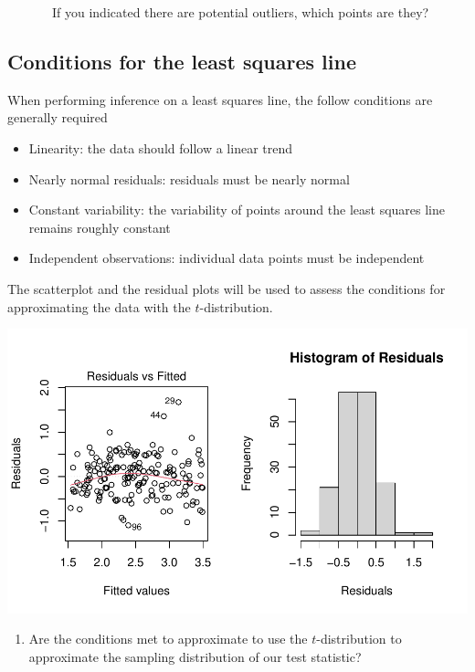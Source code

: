 \documentclass[
]{report}
\providecommand{\tightlist}{%
  \setlength{\itemsep}{0pt}\setlength{\parskip}{0pt}}
\begin{document}
\vspace{1in}

~~~~~~~If you indicated there are potential outliers, which points are they?

\vspace{0.5in}

\hypertarget{conditions-for-the-least-squares-line}{%
\subsection*{Conditions for the least squares line}\label{conditions-for-the-least-squares-line}}

When performing inference on a least squares line, the follow conditions are generally required

\begin{itemize}
\item
  Linearity: the data should follow a linear trend
\item
  Nearly normal residuals: residuals must be nearly normal
\item
  Constant variability: the variability of points around the least squares line remains roughly constant
\item
  Independent observations: individual data points must be independent
\end{itemize}

The scatterplot and the residual plots will be used to assess the conditions for approximating the data with the \(t\)-distribution.

\begin{center}\includegraphics[width=0.7\linewidth]{10-regression_files/figure-latex/unnamed-chunk-3-1} \end{center}

\begin{enumerate}
\def\labelenumi{\arabic{enumi}.}
\setcounter{enumi}{4}
\tightlist
\item
  Are the conditions met to approximate to use the \(t\)-distribution to approximate the sampling distribution of our test statistic?
\end{enumerate}
\end{document}
